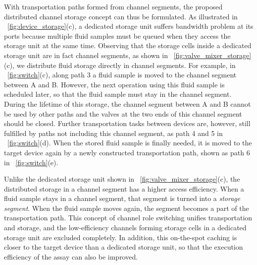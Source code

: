 With transportation paths formed from channel segments, the proposed
distributed channel storage concept can thus be formulated.
As illustrated in \figname~\ref{fig:device_storage}(c),
a dedicated storage unit suffers bandwidth problem at its ports
because multiple fluid samples must be queued when they access the storage unit
at the same time.
Observing that the storage cells
inside a dedicated storage unit
are in fact channel segments, as shown in
\figname~\ref{fig:valve_mixer_storage}(c), we distribute fluid storage
directly in channel segments. For example, in
\figname~\ref{fig:switch}(c), along path 3 a fluid sample is moved to the channel
segment between A and B. However, the next operation using this
fluid sample is scheduled later, so that the fluid sample must stay in the
channel segment. During the lifetime of this storage, the channel segment
between A and B cannot
be used by other paths
and the valves at the two ends of this channel segment should be closed.
Further transportation tasks between devices are, however, still
fulfilled by paths not including this channel segment,
as path 4 and 5 in \figname~\ref{fig:switch}(d).
When the stored fluid sample is finally needed, it is moved to the target
device again by a newly constructed transportation path, shown as path 6
in \figname~\ref{fig:switch}(e).

Unlike the dedicated storage unit shown in
\figname~\ref{fig:valve_mixer_storage}(c), the distributed storage in a
channel segment has a higher access efficiency.
When a fluid sample stays in a channel segment,
that segment is turned into a \textit{storage segment}. When the
fluid sample moves again, the segment becomes a part of
the transportation path. This concept of channel role switching
unifies transportation and storage,
and
the low-efficiency channels forming storage cells
in a dedicated storage unit are excluded completely.
In addition, this on-the-spot caching is closer to the target
device than a dedicated storage unit, so that the execution efficiency of
the assay can also be improved.

